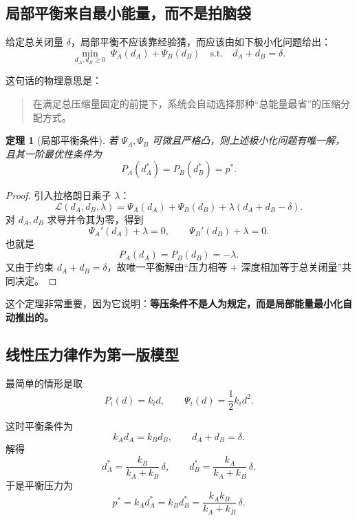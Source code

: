 \documentclass[12pt,a4paper]{ctexart}
\newtheorem{theorem}{定理}
\begin{document}
\subsection{局部平衡来自最小能量，而不是拍脑袋}
给定总关闭量 $\delta$，局部平衡不应该靠经验猜，而应该由如下极小化问题给出：
\begin{equation}
    \min_{d_A,d_B\ge 0}\; \Psi_A(d_A)+\Psi_B(d_B)
    \quad\text{s.t.}\quad d_A+d_B=\delta.
\end{equation}

这句话的物理意思是：
\begin{quote}
在满足总压缩量固定的前提下，系统会自动选择那种“总能量最省”的压缩分配方式。
\end{quote}

\begin{theorem}[局部平衡条件]
若 $\Psi_A,\Psi_B$ 可微且严格凸，则上述极小化问题有唯一解，且其一阶最优性条件为
\begin{equation}
    P_A(d_A^*) = P_B(d_B^*) = p^*.
\end{equation}
\end{theorem}

\begin{proof}
引入拉格朗日乘子 $\lambda$：
\begin{equation}
    \mathcal L(d_A,d_B,\lambda)=\Psi_A(d_A)+\Psi_B(d_B)+\lambda(d_A+d_B-\delta).
\end{equation}
对 $d_A,d_B$ 求导并令其为零，得到
\begin{equation}
    \Psi_A'(d_A)+\lambda=0,
    \qquad
    \Psi_B'(d_B)+\lambda=0.
\end{equation}
也就是
\begin{equation}
    P_A(d_A)=P_B(d_B)=-\lambda.
\end{equation}
又由于约束 $d_A+d_B=\delta$，故唯一平衡解由“压力相等 + 深度相加等于总关闭量”共同决定。
\end{proof}

这个定理非常重要，因为它说明：\textbf{等压条件不是人为规定，而是局部能量最小化自动推出的。}

\subsection{线性压力律作为第一版模型}
最简单的情形是取
\begin{equation}
    P_i(d)=k_i d,
    \qquad
    \Psi_i(d)=\frac12 k_i d^2.
\end{equation}

这时平衡条件为
\begin{equation}
    k_A d_A = k_B d_B,
    \qquad
    d_A+d_B=\delta.
\end{equation}
解得
\begin{equation}
    d_A^*=\frac{k_B}{k_A+k_B}\,\delta,
    \qquad
    d_B^*=\frac{k_A}{k_A+k_B}\,\delta.
\end{equation}
于是平衡压力为
\begin{equation}
    p^*=k_A d_A^*=k_B d_B^*=\frac{k_Ak_B}{k_A+k_B}\,\delta.
\end{equation}
\end{document}
